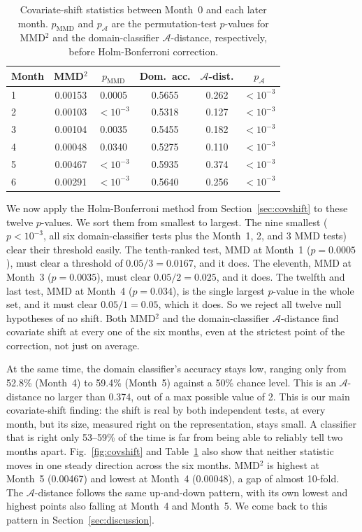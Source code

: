 \documentclass[journal]{IEEEtran}
\begin{document}
\begin{table}[t]
\caption{Covariate-shift statistics between Month~0 and each later month. $p_{\mathrm{MMD}}$ and $p_{\mathcal{A}}$ are the permutation-test $p$-values for MMD$^2$ and the domain-classifier $\mathcal{A}$-distance, respectively, before Holm-Bonferroni correction.}
\label{tab:pvalues}
\centering
\begin{tabular}{@{}lccccc@{}}
\toprule
\textbf{Month} & MMD$^2$ & $p_{\mathrm{MMD}}$ & Dom.\ acc. & $\mathcal{A}$-dist. & $p_{\mathcal{A}}$ \\
\midrule
1 & 0.00153 & 0.0005 & 0.5655 & 0.262 & $<10^{-3}$ \\
2 & 0.00103 & $<10^{-3}$ & 0.5318 & 0.127 & $<10^{-3}$ \\
3 & 0.00104 & 0.0035 & 0.5455 & 0.182 & $<10^{-3}$ \\
4 & 0.00048 & 0.0340 & 0.5275 & 0.110 & $<10^{-3}$ \\
5 & 0.00467 & $<10^{-3}$ & 0.5935 & 0.374 & $<10^{-3}$ \\
6 & 0.00291 & $<10^{-3}$ & 0.5640 & 0.256 & $<10^{-3}$ \\
\bottomrule
\end{tabular}
\end{table}

We now apply the Holm-Bonferroni method from Section~\ref{sec:covshift} to these twelve $p$-values. We sort them from smallest to largest. The nine smallest ($p<10^{-3}$, all six domain-classifier tests plus the Month~1, 2, and 3 MMD tests) clear their threshold easily. The tenth-ranked test, MMD at Month~1 ($p=0.0005$), must clear a threshold of $0.05/3=0.0167$, and it does. The eleventh, MMD at Month~3 ($p=0.0035$), must clear $0.05/2=0.025$, and it does. The twelfth and last test, MMD at Month~4 ($p=0.034$), is the single largest $p$-value in the whole set, and it must clear $0.05/1=0.05$, which it does. So we reject all twelve null hypotheses of no shift. Both MMD$^2$ and the domain-classifier $\mathcal{A}$-distance find covariate shift at every one of the six months, even at the strictest point of the correction, not just on average.

At the same time, the domain classifier's accuracy stays low, ranging only from 52.8\% (Month~4) to 59.4\% (Month~5) against a 50\% chance level. This is an $\mathcal{A}$-distance no larger than 0.374, out of a max possible value of 2. This is our main covariate-shift finding: the shift is real by both independent tests, at every month, but its size, measured right on the representation, stays small. A classifier that is right only 53--59\% of the time is far from being able to reliably tell two months apart. Fig.~\ref{fig:covshift} and Table~\ref{tab:pvalues} also show that neither statistic moves in one steady direction across the six months. MMD$^2$ is highest at Month~5 (0.00467) and lowest at Month~4 (0.00048), a gap of almost 10-fold. The $\mathcal{A}$-distance follows the same up-and-down pattern, with its own lowest and highest points also falling at Month~4 and Month~5. We come back to this pattern in Section~\ref{sec:discussion}.
\end{document}
